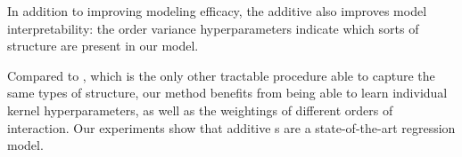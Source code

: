 In addition to improving modeling efficacy, the additive \gp{} also improves model interpretability:  the order variance hyperparameters indicate which sorts of structure are present in our model.

Compared to \HKL{}, which is the only other tractable procedure able to capture the same types of structure, our method benefits from being able to learn individual kernel hyperparameters, as well as the weightings of different orders of interaction.
Our experiments show that additive \gp{}s are a state-of-the-art regression model.



\outbpdocument{


}







%
%





 
 

